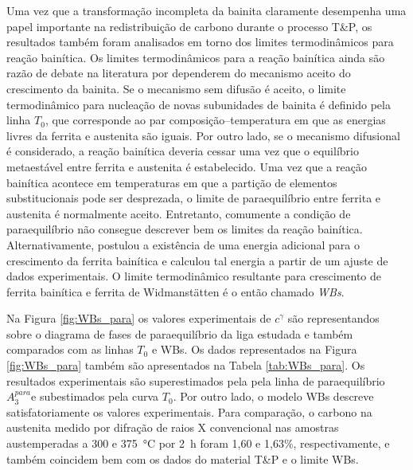 Uma vez que a transformação incompleta da bainita claramente desempenha uma papel importante na redistribuição de carbono durante o processo T\&P, os resultados também foram analisados em torno dos limites termodinâmicos para reação bainítica. Os limites termodinâmicos para a reação bainítica ainda são razão de debate na literatura por dependerem do mecanismo aceito do crescimento da bainita. Se o mecanismo sem difusão é aceito, o limite termodinâmico para nucleação de novas subunidades de bainita é definido pela linha $T_0$, que corresponde ao par composição--temperatura em que as energias livres da ferrita e austenita são iguais. 
Por outro lado, se o mecanismo difusional é considerado, a reação bainítica deveria cessar uma vez que o equilíbrio metaestável entre ferrita e austenita é estabelecido. Uma vez que a reação bainítica acontece em temperaturas em que a partição de elementos substitucionais pode ser desprezada, o limite de paraequilíbrio entre ferrita e austenita é normalmente aceito. Entretanto, comumente a condição de paraequilíbrio não consegue descrever bem os limites da reação bainítica. Alternativamente,  postulou a existência de uma energia adicional para o crescimento da ferrita bainítica e calculou tal energia a partir de um ajuste de dados experimentais. O limite termodinâmico resultante para crescimento de ferrita bainítica e ferrita de Widmanstätten é o então chamado \textit{WBs}. 


Na Figura \ref{fig:WBs_para} os valores experimentais de $c^\gamma$ são representandos sobre o diagrama de fases de paraequilíbrio da liga estudada e também comparados com as linhas $T_0$ e WBs. Os dados representados na Figura \ref{fig:WBs_para} também são apresentados na Tabela \ref{tab:WBs_para}. Os resultados experimentais são superestimados pela pela linha de paraequilíbrio $A_3^{para}$e subestimados pela curva $T_0$. Por outro lado, o modelo WBs descreve satisfatoriamente os valores experimentais. Para comparação, o carbono na austenita medido por difração de raios X convencional nas amostras austemperadas a 300 e \SI{375}{\degreeCelsius} por 2~h foram 1,60 e 1,63\%, respectivamente, e também coincidem bem com os dados do material T\&P e o limite WBs.


